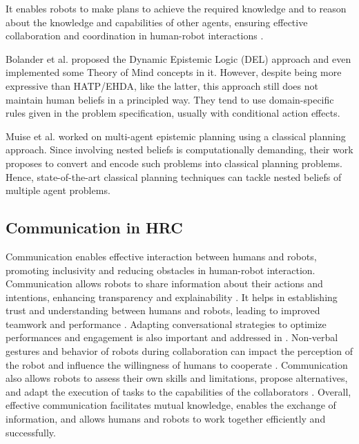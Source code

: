     It enables robots to make plans to achieve the required knowledge and to reason about the knowledge and capabilities of other agents, ensuring effective collaboration and coordination in human-robot interactions \cite{belle_epistemic_2023}.

    Bolander et al. proposed the Dynamic Epistemic Logic (DEL) approach \cite{bolander_gentle_2017} and even implemented some Theory of Mind concepts in it. However, despite being more expressive than HATP/EHDA, like the latter, this approach still does not maintain human beliefs in a principled way. They tend to use domain-specific rules given in the problem specification, usually with conditional action effects. 

    Muise et al. worked on multi-agent epistemic planning using a classical planning approach. Since involving nested beliefs is computationally demanding, their work proposes to convert and encode such problems into classical planning problems. Hence, state-of-the-art classical planning techniques can tackle nested beliefs of multiple agent problems. 

    
    \subsection{Communication in HRC}

    Communication enables effective interaction between humans and robots, promoting inclusivity and reducing obstacles in human-robot interaction. Communication allows robots to share information about their actions and intentions, enhancing transparency and explainability \cite{mcmillan_human-robot_2023}. It helps in establishing trust and understanding between humans and robots, leading to improved teamwork and performance \cite{verhagen_influence_2022}. 
    Adapting conversational strategies to optimize performances and engagement is also important and addressed in \cite{galland_adapting_2022}.
    Non-verbal gestures and behavior of robots during collaboration can impact the perception of the robot and influence the willingness of humans to cooperate \cite{arntz_collaborating_2022}. Communication also allows robots to assess their own skills and limitations, propose alternatives, and adapt the execution of tasks to the capabilities of the collaborators \cite{ferrari_bidirectional_2022}. Overall, effective communication facilitates mutual knowledge, enables the exchange of information, and allows humans and robots to work together efficiently and successfully.


